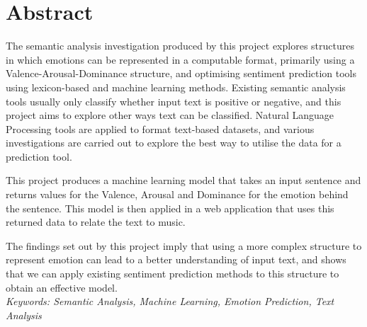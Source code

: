 \section{Abstract}

The semantic analysis investigation produced by this project explores structures in which emotions can be represented in a computable format, primarily using a Valence-Arousal-Dominance structure, and optimising sentiment prediction tools using lexicon-based and machine learning methods. Existing semantic analysis tools usually only classify whether input text is positive or negative, and this project aims to explore other ways text can be classified.
Natural Language Processing tools are applied to format text-based datasets, and various investigations are carried out to explore the best way to utilise the data for a prediction tool.

This project produces a machine learning model that takes an input sentence and returns values for the Valence, Arousal and Dominance for the emotion behind the sentence. This model is then applied in a web application that uses this returned data to relate the text to music. 

The findings set out by this project imply that using a more complex structure to represent emotion can lead to a better understanding of input text, and shows that we can apply existing sentiment prediction methods to this structure to obtain an effective model.
\\
\textit{Keywords: Semantic Analysis, Machine Learning, Emotion Prediction, Text Analysis}